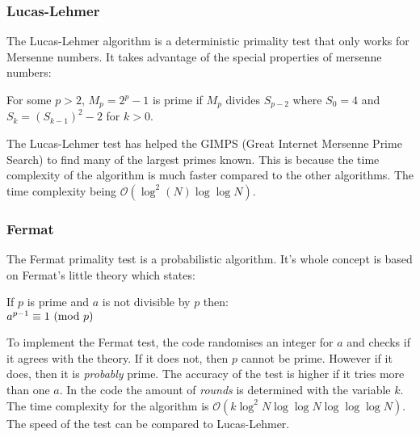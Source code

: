 \documentclass[main.tex]{subfiles}
\begin{document}
\subsubsection{Lucas-Lehmer}
The Lucas-Lehmer algorithm \cite{algh:lucas} is a deterministic primality test
that only works for Mersenne numbers. It takes advantage of the special
properties of mersenne numbers: \newline

\begin{mdframed}
  \begin{center}
    For some $p>2$, $M_p=2^p-1$ is prime if $M_p$ divides $S_{p-2}$ where $S_0=4$ and
    $S_k=(S_{k-1})^2-2$ for $k>0$.
  \end{center}
\end{mdframed}

The Lucas-Lehmer test has helped the GIMPS (Great Internet Mersenne Prime
Search) \cite{GIMPS} to find many of the largest primes known. This is because
the time complexity of the algorithm is much faster compared to the other
algorithms. The time complexity being $\mathcal{O}(\log^{2}(N) \log \log N)$. \\



\subsubsection{Fermat} \label{fermat} The Fermat primality test
\cite{algh:fermat} is a probabilistic algorithm. It's whole concept is based on
Fermat's little theory \cite{fermat:little} which states:

\begin{mdframed}
  \begin{center}
    If $p$ is prime and $a$ is not divisible by $p$ then: \\
    $a^{p - 1} \equiv 1 \ (\mathrm{mod}\ p)$
  \end{center}
\end{mdframed}

To implement the Fermat test, the code randomises an integer for $a$ and checks
if it agrees with the theory. If it does not, then $p$ cannot be prime. However
if it does, then it is \emph{probably} prime. The accuracy of the test is higher
if it tries more than one $a$. In the code the amount of \emph{rounds} is
determined with the variable $k$. The time complexity for the algorithm is
$\mathcal{O}(k \log^{2}N \log \log N \log \log \log N)$. The speed of the test
can be compared to Lucas-Lehmer.  \\
\end{document}
